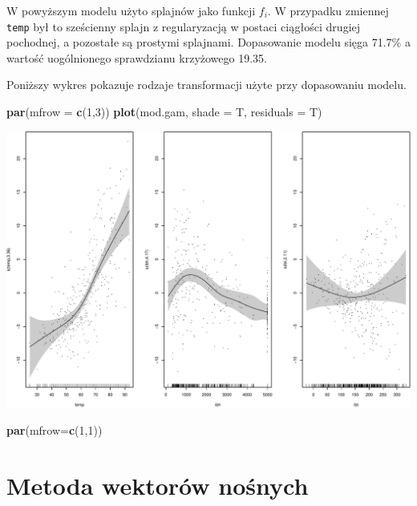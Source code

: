 \documentclass[
]{book}
\newenvironment{Shaded}{\begin{snugshade}}{\end{snugshade}}
\newcommand{\DataTypeTok}[1]{\textcolor[rgb]{0.13,0.29,0.53}{#1}}
\newcommand{\DecValTok}[1]{\textcolor[rgb]{0.00,0.00,0.81}{#1}}
\newcommand{\KeywordTok}[1]{\textcolor[rgb]{0.13,0.29,0.53}{\textbf{#1}}}
\newcommand{\NormalTok}[1]{#1}
\theoremstyle{plain}
\theoremstyle{definition}
\theoremstyle{definition}
\theoremstyle{definition}
\theoremstyle{definition}
\theoremstyle{remark}
\begin{document}
W powyższym modelu użyto splajnów jako funkcji \(f_i\). W przypadku zmiennej \texttt{temp} był to sześcienny splajn z regularyzacją w postaci ciągłości drugiej pochodnej, a pozostałe są prostymi splajnami. Dopasowanie modelu sięga 71.7\% a wartość uogólnionego sprawdzianu krzyżowego 19.35.

Poniższy wykres pokazuje rodzaje transformacji użyte przy dopasowaniu modelu.

\begin{Shaded}
\begin{Highlighting}[]
\KeywordTok{par}\NormalTok{(}\DataTypeTok{mfrow =} \KeywordTok{c}\NormalTok{(}\DecValTok{1}\NormalTok{,}\DecValTok{3}\NormalTok{))}
\KeywordTok{plot}\NormalTok{(mod.gam, }\DataTypeTok{shade =}\NormalTok{ T, }\DataTypeTok{residuals =}\NormalTok{ T)}
\end{Highlighting}
\end{Shaded}

\includegraphics{EksploracjaDanych_files/figure-latex/unnamed-chunk-85-1.pdf}

\begin{Shaded}
\begin{Highlighting}[]
\KeywordTok{par}\NormalTok{(}\DataTypeTok{mfrow=}\KeywordTok{c}\NormalTok{(}\DecValTok{1}\NormalTok{,}\DecValTok{1}\NormalTok{))}
\end{Highlighting}
\end{Shaded}

\hypertarget{metoda-wektoruxf3w-noux15bnych}{%
\chapter{Metoda wektorów nośnych}\label{metoda-wektoruxf3w-noux15bnych}}
\end{document}
